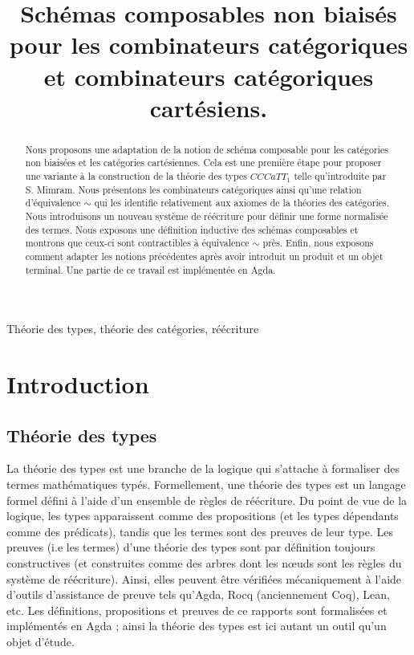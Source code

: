 \documentclass[conference]{IEEEtran}
\begin{document}
\title{Schémas composables non biaisés pour les combinateurs catégoriques et combinateurs catégoriques cartésiens.}

\author{
}
\maketitle

\begin{abstract}Nous proposons une adaptation de la notion de schéma composable pour les catégories non biaisées et les catégories cartésiennes. Cela est une première étape pour proposer une variante à la construction de la théorie des types $CCCaTT_1$ telle qu'introduite par S. Mimram. Nous présentons les combinateurs catégoriques ainsi qu'une relation d'équivalence $\sim$ qui les identifie relativement aux axiomes de la théories des catégories. Nous introduisons un nouveau système de réécriture pour définir une forme normalisée des termes. Nous exposons une définition inductive des schémas composables et montrons que ceux-ci sont contractibles à équivalence $\sim$ près. Enfin, nous exposons comment adapter les notions précédentes après avoir introduit un produit et un objet terminal. Une partie de ce travail est implémentée en Agda.
\end{abstract}

\begin{IEEEkeywords}
Théorie des types, théorie des catégories, réécriture
\end{IEEEkeywords}

\section{Introduction}

\subsection{Théorie des types} La théorie des types est une branche de la logique qui s'attache à formaliser des termes mathématiques typés. Formellement, une théorie des types est un langage formel défini à l'aide d'un ensemble de règles de réécriture. Du point de vue de la logique, les types apparaissent comme des propositions (et les types dépendants comme des prédicats), tandis que les termes sont des preuves de leur type. Les preuves (i.e les termes) d'une théorie des types sont par définition toujours constructives (et construites comme des arbres dont les nœuds sont les règles du système de réécriture). Ainsi, elles peuvent être vérifiées mécaniquement à l'aide d'outils d'assistance de preuve tels qu'Agda, Rocq (anciennement Coq), Lean, etc. Les définitions, propositions et preuves de ce rapports sont formalisées et implémentés en Agda ; ainsi la théorie des types est ici autant un outil qu'un objet d'étude.
\end{document}
